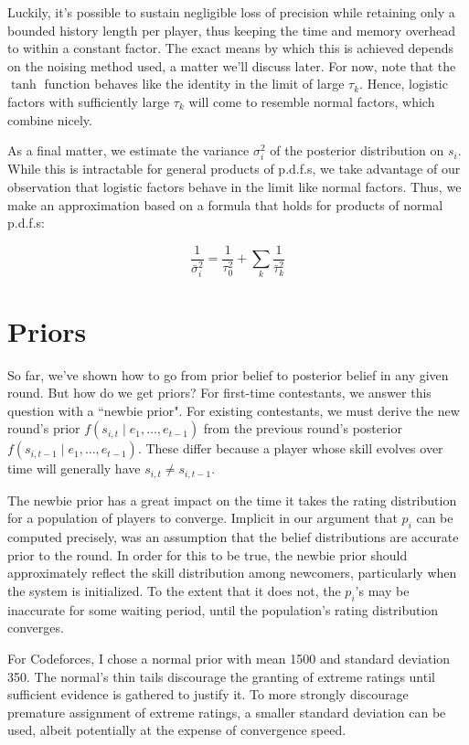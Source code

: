 \documentclass{article}
\begin{document}
Luckily, it's possible to sustain negligible loss of precision while retaining only a bounded history length per player, thus keeping the time and memory overhead to within a constant factor. The exact means by which this is achieved depends on the noising method used, a matter we'll discuss later. For now, note that the $\tanh$ function behaves like the identity in the limit of large $\tau_k$. Hence, logistic factors with sufficiently large $\tau_k$ will come to resemble normal factors, which combine nicely.

As a final matter, we estimate the variance $\sigma_i^2$ of the posterior distribution on $s_i$. While this is intractable for general products of p.d.f.s, we take advantage of our observation that logistic factors behave in the limit like normal factors. Thus, we make an approximation based on a formula that holds for products of normal p.d.f.s:

\[\frac{1}{\bar\sigma_i^2} = \frac{1}{\tau_0^2} + \sum_k \frac{1}{\bar\tau_k^2}\]

\section{Priors}

So far, we've shown how to go from prior belief to posterior belief in any given round. But how do we get priors? For first-time contestants, we answer this question with a ``newbie prior". For existing contestants, we must derive the new round's prior $f(s_{i,t} \mid e_1,\ldots,e_{t-1})$ from the previous round's posterior $f(s_{i,t-1} \mid e_1,\ldots,e_{t-1})$. These differ because a player whose skill evolves over time will generally have $s_{i,t} \ne s_{i,t-1}$.

The newbie prior has a great impact on the time it takes the rating distribution for a population of players to converge. Implicit in our argument that $p_i$ can be computed precisely, was an assumption that the belief distributions are accurate prior to the round. In order for this to be true, the newbie prior should approximately reflect the skill distribution among newcomers, particularly when the system is initialized. To the extent that it does not, the $p_i$'s may be inaccurate for some waiting period, until the population's rating distribution converges.

For Codeforces, I chose a normal prior with mean 1500 and standard deviation 350. The normal's thin tails discourage the granting of extreme ratings until sufficient evidence is gathered to justify it. To more strongly discourage premature assignment of extreme ratings, a smaller standard deviation can be used, albeit potentially at the expense of convergence speed.
\end{document}
